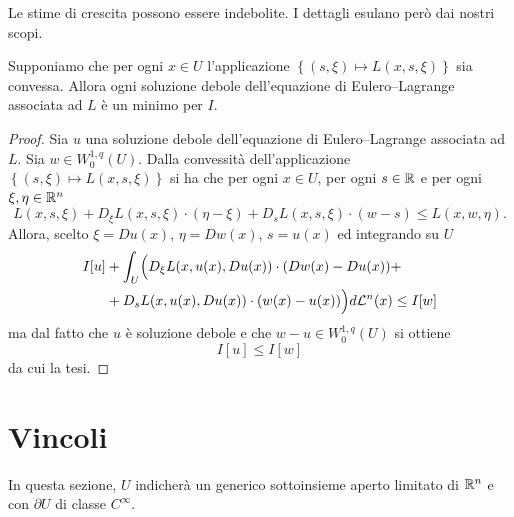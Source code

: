 \begin{osservazione}
	Le stime di crescita possono essere indebolite. I dettagli esulano però dai nostri scopi.
\end{osservazione}
\begin{proposizione}
	Supponiamo che per ogni $x \in U$ l'applicazione $\left\lbrace (s,\xi) \mapsto L(x,s,\xi)\right\rbrace $ sia convessa. Allora ogni soluzione debole dell'equazione di Eulero--Lagrange associata ad $L$ è un minimo per $I$.
\end{proposizione}
\begin{proof}
	Sia $u$ una soluzione debole dell'equazione di Eulero--Lagrange associata ad $L$. Sia $w \in W^{1,q}_0(U)$. Dalla convessità dell'applicazione $\left\lbrace (s,\xi) \mapsto L(x,s,\xi)\right\rbrace $ si ha che per ogni $x \in U$, per ogni $s \in \mathbb{R}$ e per ogni $\xi, \eta \in \mathbb{R}^n$
	\[ L(x,s,\xi) + D_\xi L(x,s,\xi) \cdot (\eta - \xi) + D_s L(x,s,\xi) \cdot (w-s) \le L(x,w,\eta). \]
	Allora, scelto $\xi = Du(x)$, $\eta = Dw(x)$, $s = u(x)$ ed integrando su $U$
	\begin{align*}
		I[u] &+ \int_U \Bigl(D_\xi L(x,u(x),Du(x)) \cdot (Dw(x) - Du(x)) + \\
		&+D_s L(x,u(x),Du(x)) \cdot (w(x)-u(x)) \Bigr) d\mathcal{L}^n(x) \le I[w]
	\end{align*}
	ma dal fatto che $u$ è soluzione debole e che $w-u \in W^{1,q}_0(U)$ si ottiene
	\[ I[u] \le I[w] \]
	da cui la tesi.
\end{proof}

\section{Vincoli}
In questa sezione, $U$ indicherà un generico sottoinsieme aperto limitato di $\mathbb{R}^n$ e con $\partial U$ di classe $C^\infty$. 

